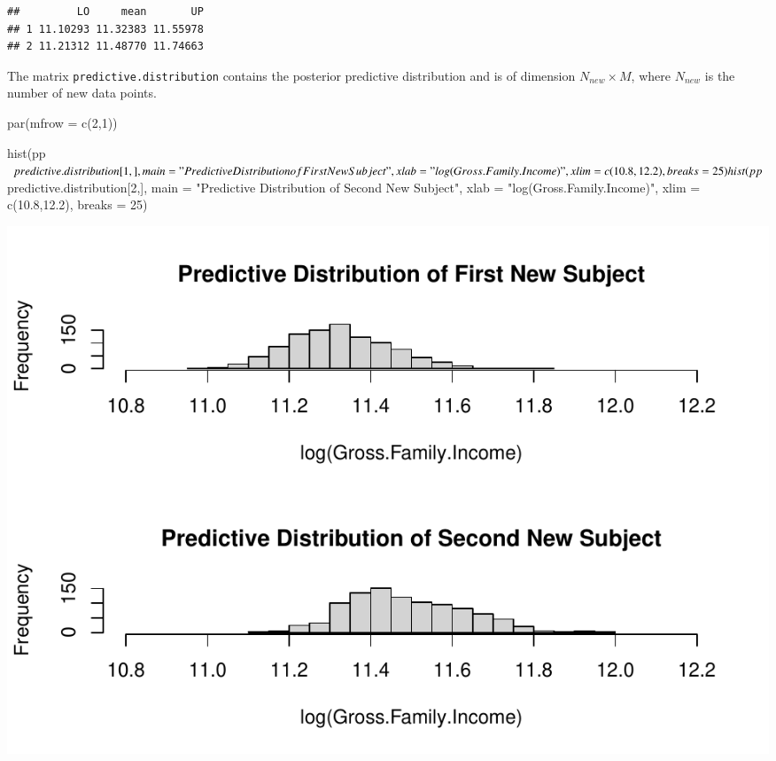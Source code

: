 \documentclass[a4paper, preprint, 3p,
authoryear]{elsarticle} %
\newenvironment{Shaded}{\begin{snugshade}}{\end{snugshade}}
\newcommand{\NormalTok}[1]{#1}
\newcommand{\pandocbounded}[1]{#1}
\begin{document}
\begin{Shaded}
\end{Shaded}

\begin{verbatim}
##         LO     mean       UP
## 1 11.10293 11.32383 11.55978
## 2 11.21312 11.48770 11.74663
\end{verbatim}

The matrix \texttt{predictive.distribution} contains the posterior
predictive distribution and is of dimension \(N_{new} \times M\), where
\(N_{new}\) is the number of new data points.

\begin{Shaded}
\begin{Highlighting}[]
\NormalTok{par(mfrow = c(2,1))}

\NormalTok{hist(pp$predictive.distribution[1,], }
\NormalTok{     main = "Predictive Distribution of First New Subject",}
\NormalTok{     xlab = "log(Gross.Family.Income)",}
\NormalTok{     xlim = c(10.8,12.2),}
\NormalTok{     breaks = 25)}

\NormalTok{hist(pp$predictive.distribution[2,], }
\NormalTok{     main = "Predictive Distribution of Second New Subject",}
\NormalTok{     xlab = "log(Gross.Family.Income)",}
\NormalTok{     xlim = c(10.8,12.2),}
\NormalTok{     breaks = 25)}
\end{Highlighting}
\end{Shaded}

\pandocbounded{\includegraphics[keepaspectratio]{Vignette-for-panelTVP_files/figure-latex/unnamed-chunk-26-1.pdf}}
\end{document}
